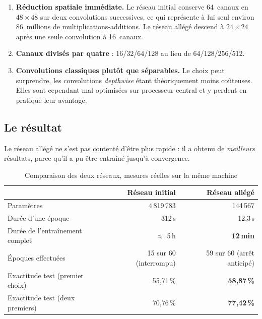 \documentclass[a4paper,12pt]{report}
\begin{document}
\begin{enumerate}[leftmargin=*,itemsep=3pt]
  \item \textbf{Réduction spatiale immédiate.} Le réseau initial conserve
        64~canaux en $48\times48$ sur deux convolutions successives, ce qui
        représente à lui seul environ 86~millions de multiplications-additions.
        Le réseau allégé descend à $24\times24$ après une seule convolution à
        16~canaux.
  \item \textbf{Canaux divisés par quatre} : 16/32/64/128 au lieu de
        64/128/256/512.
  \item \textbf{Convolutions classiques plutôt que séparables.} Le choix peut
        surprendre, les convolutions \emph{depthwise} étant théoriquement moins
        coûteuses. Elles sont cependant mal optimisées sur processeur central et
        y perdent en pratique leur avantage.
\end{enumerate}

\subsection*{Le résultat}
Le réseau allégé ne s'est pas contenté d'être plus rapide : il a obtenu de
\emph{meilleurs} résultats, parce qu'il a pu être entraîné jusqu'à convergence.

\begin{table}[htbp]
\centering
\caption{Comparaison des deux réseaux, mesures réelles sur la même machine}
\label{tab:comparaison}
\begin{tabularx}{\textwidth}{|>{\raggedright\arraybackslash}X|r|r|}
\hline
 & \textbf{Réseau initial} & \textbf{Réseau allégé} \\
\hline
Paramètres                      & 4\,819\,783 & 144\,567 \\
Durée d'une époque              & 312\,s      & 12{,}3\,s \\
Durée de l'entraînement complet & $\approx$ 5\,h & \textbf{12\,min} \\
Époques effectuées              & 15 sur 60 (interrompu) & 59 sur 60 (arrêt anticipé) \\
\hline
Exactitude test (premier choix) & 55{,}71\,\% & \textbf{58{,}87\,\%} \\
Exactitude test (deux premiers) & 70{,}76\,\% & \textbf{77{,}42\,\%} \\
\hline
\end{tabularx}
\end{table}
\end{document}
